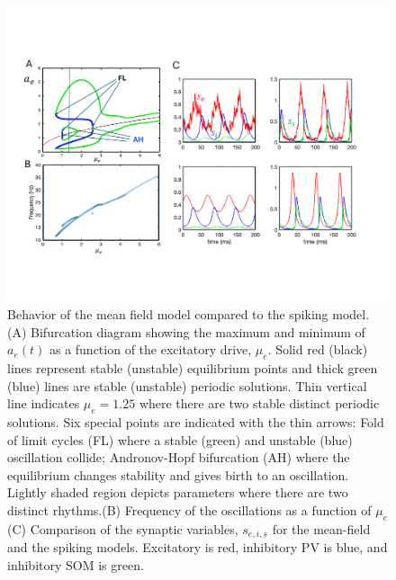 \documentclass[10pt,letterpaper]{article}
\begin{document}
\begin{figure}
\includegraphics[width=.9\textwidth]{afig3.pdf}
\caption{Behavior of the mean field model compared to the spiking model. (A) Bifurcation diagram showing the maximum and minimum of $a_e(t)$ as a function of the excitatory drive, $\mu_e$. Solid red (black) lines represent stable (unstable) equilibrium points and thick green (blue) lines are stable (unstable) periodic solutions. Thin vertical line indicates $\mu_e=1.25$ where there are two stable distinct periodic solutions. Six special points are indicated with the thin arrows: Fold of limit cycles (FL) where a stable (green) and unstable (blue) oscillation collide; Andronov-Hopf bifurcation (AH) where the equilibrium changes stability and gives birth to an oscillation. Lightly shaded region depicts parameters where there are two distinct rhythms.(B) Frequency of the oscillations as a function of $\mu_e$ (C) Comparison of the synaptic variables, $s_{e,i,s}$ for the mean-field and the spiking models. Excitatory is red, inhibitory PV is blue, and inhibitory SOM is green.}
\label{fig:2}
\end{figure}
\end{document}
